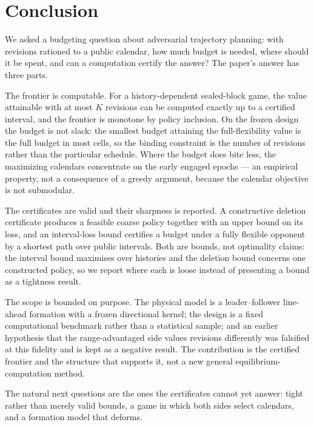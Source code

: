 \section{Conclusion}\label{sec:conclusion}

We asked a budgeting question about adversarial trajectory planning: with
revisions rationed to a public calendar, how much budget is needed, where
should it be spent, and can a computation certify the answer? The paper's
answer has three parts.

The frontier is computable. For a history-dependent sealed-block game, the
value attainable with at most $K$ revisions can be computed exactly up to a
certified interval, and the frontier is monotone by policy inclusion. On the
frozen design the budget is not slack: the smallest budget attaining the
full-flexibility value is the full budget in most cells, so the binding
constraint is the number of revisions rather than the particular schedule.
Where the budget does bite less, the maximizing calendars concentrate on the
early engaged epochs --- an empirical property, not a consequence of a greedy
argument, because the calendar objective is not submodular.

The certificates are valid and their sharpness is reported. A constructive
deletion certificate produces a feasible coarse policy together with an upper
bound on its loss, and an interval-loss bound certifies a budget under a fully
flexible opponent by a shortest path over public intervals. Both are bounds,
not optimality claims: the interval bound maximises over histories and the
deletion bound concerns one constructed policy, so we report where each is
loose instead of presenting a bound as a tightness result.

The scope is bounded on purpose. The physical model is a leader--follower
line-ahead formation with a frozen directional kernel; the design is a fixed
computational benchmark rather than a statistical sample; and an earlier
hypothesis that the range-advantaged side values revisions differently was
falsified at this fidelity and is kept as a negative result. The contribution
is the certified frontier and the structure that supports it, not a new
general equilibrium-computation method.

The natural next questions are the ones the certificates cannot yet answer:
tight rather than merely valid bounds, a game in which both sides select
calendars, and a formation model that deforms.
